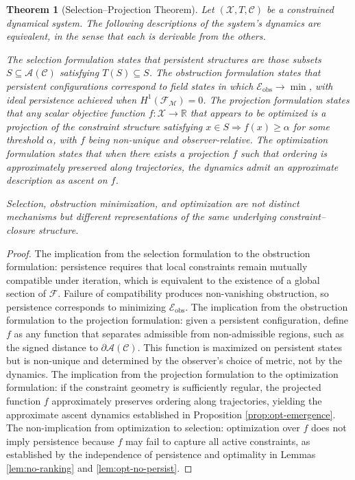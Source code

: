 \documentclass[12pt, a4paper, oneside]{article}
\theoremstyle{plain}
\newtheorem{theorem}{Theorem}[section]
\theoremstyle{definition}
\theoremstyle{remark}
\newcommand{\X}{\mathcal{X}}
\newcommand{\C}{\mathcal{C}}
\newcommand{\A}{\mathcal{A}}
\newcommand{\T}{T}
\begin{document}
\begin{theorem}[Selection--Projection Theorem]
\label{thm:selection-projection}
Let $(\X, \T, \C)$ be a constrained dynamical system. The following descriptions of the system's dynamics are equivalent, in the sense that each is derivable from the others.

The selection formulation states that persistent structures are those subsets $S \subseteq \A(\C)$ satisfying $\T(S) \subseteq S$. The obstruction formulation states that persistent configurations correspond to field states in which $\mathcal{E}_{\mathrm{obs}} \to \min$, with ideal persistence achieved when $H^1(\mathcal{F}_\mathcal{M}) = 0$. The projection formulation states that any scalar objective function $f : \X \to \mathbb{R}$ that appears to be optimized is a projection of the constraint structure satisfying $x \in S \Rightarrow f(x) \geq \alpha$ for some threshold $\alpha$, with $f$ being non-unique and observer-relative. The optimization formulation states that when there exists a projection $f$ such that ordering is approximately preserved along trajectories, the dynamics admit an approximate description as ascent on $f$.

Selection, obstruction minimization, and optimization are not distinct mechanisms but different representations of the same underlying constraint--closure structure.
\end{theorem}

\begin{proof}
The implication from the selection formulation to the obstruction formulation: persistence requires that local constraints remain mutually compatible under iteration, which is equivalent to the existence of a global section of $\mathcal{F}$. Failure of compatibility produces non-vanishing obstruction, so persistence corresponds to minimizing $\mathcal{E}_{\mathrm{obs}}$. The implication from the obstruction formulation to the projection formulation: given a persistent configuration, define $f$ as any function that separates admissible from non-admissible regions, such as the signed distance to $\partial \A(\C)$. This function is maximized on persistent states but is non-unique and determined by the observer's choice of metric, not by the dynamics. The implication from the projection formulation to the optimization formulation: if the constraint geometry is sufficiently regular, the projected function $f$ approximately preserves ordering along trajectories, yielding the approximate ascent dynamics established in Proposition \ref{prop:opt-emergence}. The non-implication from optimization to selection: optimization over $f$ does not imply persistence because $f$ may fail to capture all active constraints, as established by the independence of persistence and optimality in Lemmas \ref{lem:no-ranking} and \ref{lem:opt-no-persist}.
\end{proof}
\end{document}
